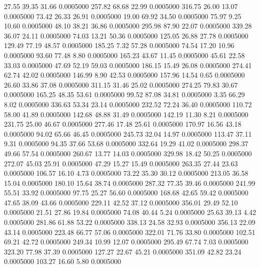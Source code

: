   27.55   39.35   31.66   0.0005000
 257.82   68.68   22.99   0.0005000
 316.75   26.00   13.07   0.0005000
  73.42   26.33   26.91   0.0005000
  19.00   69.92   34.50   0.0005000
  75.97    9.25   10.60   0.0005000
  48.10   38.21   36.86   0.0005000
 295.98   87.90   22.07   0.0005000
 339.28   36.07   24.11   0.0005000
  74.03   13.21   50.36   0.0005000
 125.05   26.88   27.78   0.0005000
 129.49   77.19   48.57   0.0005000
 185.25    7.32   57.28   0.0005000
  74.54   17.20   10.96   0.0005000
  93.60   77.48    8.80   0.0005000
 165.23   43.67   11.45   0.0005000
  45.61   22.58   33.03   0.0005000
  47.69   52.19   59.03   0.0005000
 186.15   15.49   26.08   0.0005000
 274.41   62.74   42.02   0.0005000
 146.99    8.90   42.53   0.0005000
 157.96   14.54    0.65   0.0005000
  26.60   33.86   37.08   0.0005000
 311.15   31.46   25.02   0.0005000
 274.25   79.83   30.67   0.0005000
 165.25   48.35   53.61   0.0005000
  99.52   87.08   34.81   0.0005000
   3.35   66.29    8.02   0.0005000
 336.63   53.34   23.14   0.0005000
 232.52   72.24   36.40   0.0005000
 110.72   58.00   41.89   0.0005000
 142.68   48.88   31.49   0.0005000
 142.19   11.30    8.21   0.0005000
 231.75   25.00   46.67   0.0005000
 277.46   17.48   25.61   0.0005000
 170.97   16.56   43.18   0.0005000
  94.02   65.66   46.45   0.0005000
 245.73   32.04   14.97   0.0005000
 113.47   37.11    9.31   0.0005000
  94.35   37.66   53.68   0.0005000
 332.64   19.29   41.02   0.0005000
 298.37   49.66   57.54   0.0005000
 260.67   13.77   14.03   0.0005000
 329.98   18.42   50.25   0.0005000
 272.07   45.03   25.91   0.0005000
  47.29   15.27   15.49   0.0005000
 263.35   27.44   23.63   0.0005000
 106.57   16.10    4.73   0.0005000
  73.22   35.30   30.12   0.0005000
 213.05   36.58   15.04   0.0005000
 180.10   15.64   38.74   0.0005000
 287.32   77.35   39.46   0.0005000
 241.99   55.51   33.92   0.0005000
  97.75   25.27   56.60   0.0005000
 168.68   42.65   59.42   0.0005000
  47.65   38.09   43.66   0.0005000
 229.11   42.52   37.12   0.0005000
 356.01   29.49   52.10   0.0005000
  21.51   27.86   19.84   0.0005000
  74.08   40.44    5.24   0.0005000
  25.63   39.13    4.42   0.0005000
 281.86   61.88   53.22   0.0005000
 338.13   24.58   32.93   0.0005000
 356.13   22.09   43.14   0.0005000
 223.48   66.77   57.06   0.0005000
 322.01   71.76   33.80   0.0005000
 102.51   69.21   42.72   0.0005000
 249.34   10.99   12.07   0.0005000
 295.49   67.74    7.03   0.0005000
 323.20   77.98   37.39   0.0005000
 127.27   22.67   45.21   0.0005000
 351.09   42.82   23.24   0.0005000
 103.27   16.60    5.80   0.0005000
